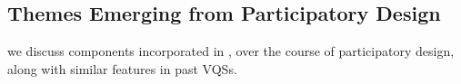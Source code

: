 \subsection{Themes Emerging from Participatory Design\label{sec:pd_findings}}
 we discuss components 
incorporated in \zvpp, over the course of participatory design, 
along with similar features in past VQSs.

